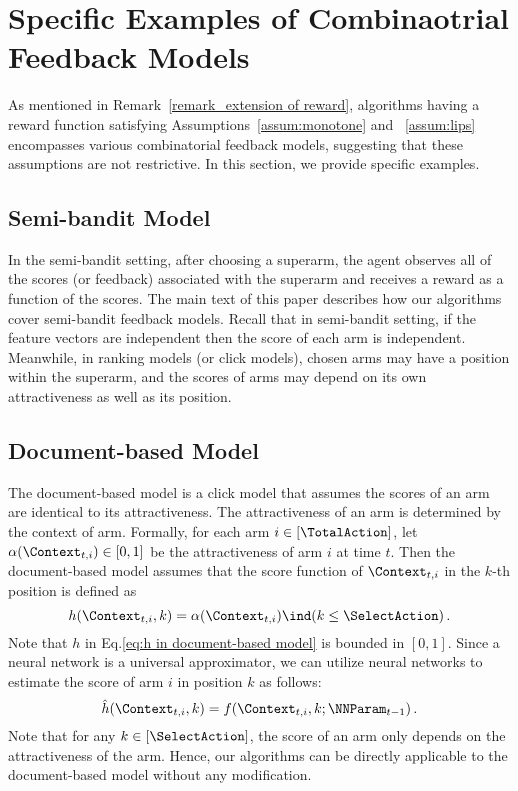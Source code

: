 \documentclass{article}
\theoremstyle{plain}
\begin{document}
\section{Specific Examples of Combinaotrial Feedback Models} \label{appendix_combinaotiral feedbacks}

As mentioned in Remark~\ref{remark_extension of reward}, algorithms having a reward function satisfying Assumptions~\ref{assum:monotone} and ~\ref{assum:lips} encompasses various combinatorial feedback models, suggesting that these assumptions are not restrictive.
In this section, we provide specific examples.

\subsection{Semi-bandit Model}
In the semi-bandit setting, after choosing a superarm, the agent observes all of the scores (or feedback) associated with the superarm and receives a reward as a function of the scores.
The main text of this paper describes how our algorithms cover semi-bandit feedback models.
Recall that in semi-bandit setting, if the feature vectors are independent then the score of each arm is independent. 
Meanwhile, in ranking models (or click models), chosen arms may have a position within the superarm, and the scores of arms may depend on its own attractiveness as well as its position.

\subsection{Document-based Model}
The document-based model is a click model that assumes the scores of an arm are identical to its attractiveness. 
The attractiveness of an arm is determined by the context of arm.
Formally, for each arm $i \in [\TotalAction]$, let $\alpha(\Context_{t,i}) \in [0, 1]$ be the attractiveness of arm $i$ at time $t$.
Then the document-based model assumes that the score function of $\Context_{t,i}$ in the $k$-th position is defined as
\begin{equation} \label{eq:h in document-based model}
    h(\Context_{t,i}, k) = \alpha(\Context_{t,i}) \ind(k \le \SelectAction) \, .
\end{equation}
Note that $h$ in Eq.\eqref{eq:h in document-based model} is bounded in $[0,1]$. 
Since a neural network is a universal approximator, we can utilize neural networks to estimate the score of arm $i$ in position $k$ as follows:
\begin{equation*}
    \hat{h}(\Context_{t,i}, k) = f(\Context_{t,i}, k ; \NNParam_{t-1}) \, .
\end{equation*}
Note that for any $k \in [\SelectAction]$, the score of an arm only depends on the attractiveness of the arm. 
Hence, our algorithms can be directly applicable to the document-based model without any modification.
\end{document}
